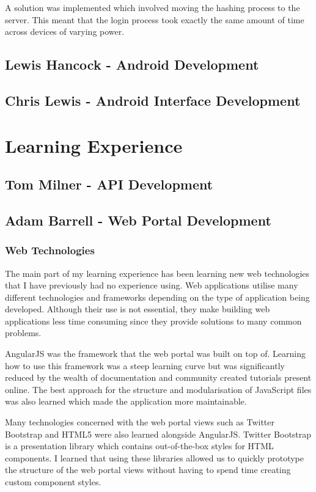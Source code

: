 \documentclass[11pt,a4paper]{report}
\begin{document}
A solution was implemented which involved moving the hashing process to the server. This meant that the login process took exactly the same amount of time across devices of varying power.

\subsection{Lewis Hancock - Android Development}
\subsection{Chris Lewis - Android Interface Development}
\section{Learning Experience}
\label{sec:learning-experience}
\subsection{Tom Milner - API Development}
\subsection{Adam Barrell - Web Portal Development}

\subsubsection{Web Technologies}
The main part of my learning experience has been learning new web technologies that I have previously had no experience using. Web applications utilise many different technologies and frameworks depending on the type of application being developed. Although their use is not essential, they make building web applications less time consuming since they provide solutions to many common problems.

AngularJS was the framework that the web portal was built on top of. Learning how to use this framework was a steep learning curve but was significantly reduced by the wealth of documentation and community created tutorials present online. The best approach for the structure and modularisation of JavaScript files was also learned which made the application more maintainable. 

Many technologies concerned with the web portal views such as Twitter Bootstrap and HTML5 were also learned alongside AngularJS. Twitter Bootstrap is a presentation library which contains out-of-the-box styles for HTML components. I learned that using these libraries allowed us to quickly prototype the structure of the web portal views without having to spend time creating custom component styles.
\end{document}
